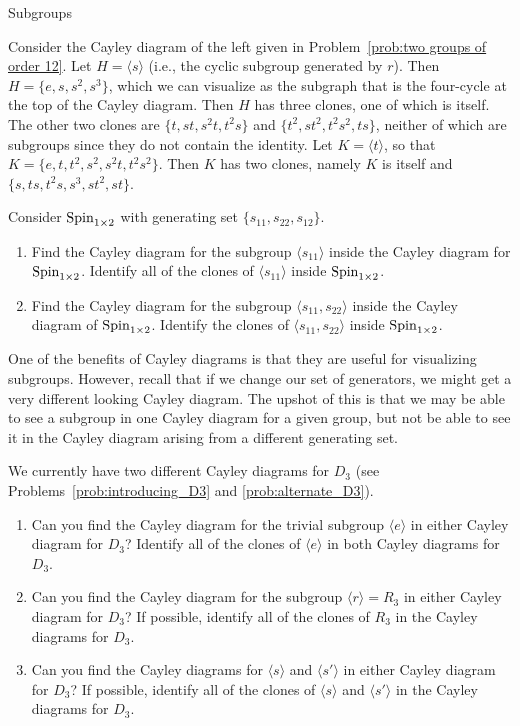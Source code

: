 \begin{section}{Subgroups}
\begin{example}
Consider the Cayley diagram of the left given in Problem~\ref{prob:two groups of order 12}. Let $H=\langle s\rangle$ (i.e., the cyclic subgroup generated by $r$).  Then $H=\{e,s,s^2,s^3\}$, which we can visualize as the subgraph that is the four-cycle at the top of the Cayley diagram.  Then $H$ has three clones, one of which is itself.  The other two clones are $\{t,st,s^2t,t^2s\}$ and $\{t^2,st^2,t^2s^2,ts\}$, neither of which are subgroups since they do not contain the identity.  Let $K=\langle t\rangle$, so that $K=\{e,t,t^2,s^2,s^2t,t^2s^2\}$.  Then $K$ has two clones, namely $K$ is itself and $\{s,ts,t^2s,s^3,st^2,st\}$.
\end{example}

\begin{problem}
Consider $\operatorname{Spin}_{1\times 2}$ with generating set $\{s_{11}, s_{22},s_{12}\}$.  
\begin{enumerate}[label=\textrm{(\alph*)}]
\item Find the Cayley diagram for the subgroup $\langle s_{11}\rangle$ inside the Cayley diagram for $\operatorname{Spin}_{1\times 2}$.  Identify all of the clones of $\langle s_{11}\rangle$ inside $\operatorname{Spin}_{1\times 2}$.
\item Find the Cayley diagram for the subgroup $\langle s_{11}, s_{22}\rangle$ inside the Cayley diagram of $\operatorname{Spin}_{1\times 2}$.  Identify the clones of $\langle s_{11}, s_{22}\rangle$ inside $\operatorname{Spin}_{1\times 2}$.
\end{enumerate}
\end{problem}

One of the benefits of Cayley diagrams is that they are useful for visualizing subgroups.  However, recall that if we change our set of generators, we might get a very different looking Cayley diagram.  The upshot of this is that we may be able to see a subgroup in one Cayley diagram for a given group, but not be able to see it in the Cayley diagram arising from a different generating set.

\begin{problem}
We currently have two different Cayley diagrams for $D_3$ (see Problems~\ref{prob:introducing_D3} and \ref{prob:alternate_D3}).  
\begin{enumerate}[label=\textrm{(\alph*)}]
\item Can you find the Cayley diagram for the trivial subgroup $\langle e\rangle$ in either Cayley diagram for $D_3$?  Identify all of the clones of $\langle e\rangle$ in both Cayley diagrams for $D_3$.
\item Can you find the Cayley diagram for the subgroup $\langle r\rangle =R_3$ in either Cayley diagram for $D_3$?  If possible, identify all of the clones of $R_3$ in the Cayley diagrams for $D_3$.
\item Can you find the Cayley diagrams for $\langle s\rangle$ and $\langle s'\rangle$ in either Cayley diagram for $D_3$?  If possible, identify all of the clones of $\langle s\rangle$ and $\langle s'\rangle$ in the Cayley diagrams for $D_3$.
\end{enumerate}
\end{problem}


\end{section}

